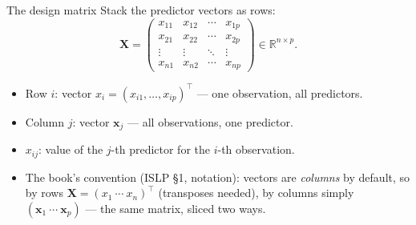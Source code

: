 \documentclass[aspectratio=169,11pt]{beamer}
\begin{document}
\begin{frame}{The design matrix}\label{frm:design}
  Stack the predictor vectors as rows:
  \[
    \boxed{\;
      \mathbf{X} =
      \begin{pmatrix}
        x_{11} & x_{12} & \cdots & x_{1p} \\
        x_{21} & x_{22} & \cdots & x_{2p} \\
        \vdots & \vdots & \ddots & \vdots \\
        x_{n1} & x_{n2} & \cdots & x_{np}
      \end{pmatrix} \in \mathbb{R}^{n\times p}.
    \;}
  \]
  \begin{readme}
    \begin{itemize}
      \item Row $i$: vector $x_i = (x_{i1}, \ldots, x_{ip})^\top$ ---
            one observation, all predictors.
      \item Column $j$: vector $\mathbf{x}_j$ --- all observations, one
            predictor.
      \item $x_{ij}$: value of the $j$-th predictor for the $i$-th
            observation.
      \item The book's convention (ISLP \S1, notation): vectors are
            \emph{columns} by default, so by rows
            $\mathbf{X} = (x_1\ \cdots\ x_n)^\top$ (transposes needed), by
            columns simply $(\mathbf{x}_1\ \cdots\ \mathbf{x}_p)$ --- the
            same matrix, sliced two ways.
    \end{itemize}
  \end{readme}
\end{frame}
\end{document}
